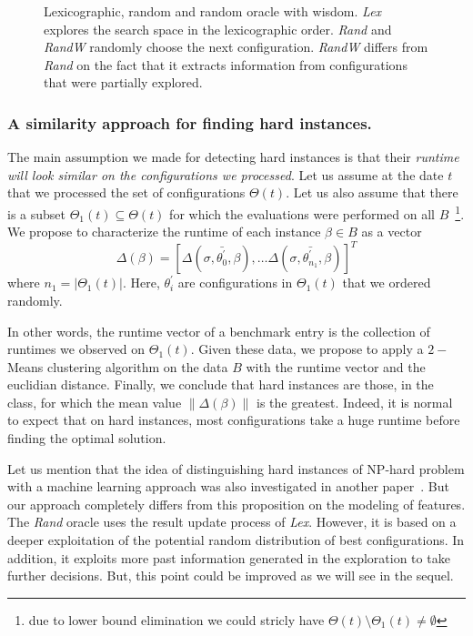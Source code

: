 \documentclass[10pt, conference, compsocconf]{IEEEtran}
\newcommand{\norm}[1]{\left\lVert#1\right\rVert}
\begin{document}
	\begin{figure}[hbtp]
	\begin{center}
	
	\caption{Lexicographic, random and random oracle with wisdom.
        {\it Lex} explores the search space in the lexicographic order. {\it Rand}  and {\it RandW} 
        randomly choose the next configuration. {\it RandW} differs from {\it Rand} on the fact that 
        it extracts information from configurations that were partially explored.}
	\label{fig:Search}
	\end{center}
	\end{figure}


\subsubsection{A similarity approach for finding hard instances.}  

The main assumption we made for detecting hard instances is that their {\it runtime will look similar on the configurations 
we processed}.
Let us assume at the date $t$ that we processed the set of configurations $\Theta(t)$. Let us also assume that 
there is a subset $\Theta_1(t) \subseteq \Theta(t)$ for which the evaluations were performed on all $B$~\footnote{due 
to lower bound elimination we could stricly have $\Theta(t) \setminus \Theta_1(t) \neq \emptyset$}. 
We propose to characterize the runtime of each instance $\beta \in B$ as a vector \[ \Delta(\beta) = [\Delta(\sigma, \bar{\theta^{'}_0}, \beta), \dots \Delta(\sigma, \bar{\theta^{'}_{n_1}}, \beta) ]^T \] where $n_1 = |\Theta_1(t)|$. Here, $\theta^{'}_{i}$ are configurations in $\Theta_1(t)$ 
that we ordered randomly.

In other words, the runtime vector of a benchmark entry is the collection of runtimes we observed on $\Theta_1(t)$. 
Given these data, we propose to apply a $2-$Means clustering algorithm on the data $B$ with the runtime 
vector and the euclidian distance. Finally, we conclude that hard instances are those, in the class, for 
which the mean value $\norm{\Delta(\beta)}$ is the greatest. Indeed, it is normal to expect that on hard instances, 
most configurations take a huge runtime before finding the optimal solution. 

Let us mention that the idea of distinguishing hard instances of NP-hard problem with a machine learning approach was also 
investigated in another paper~\cite{WZZReport}. But our approach completely differs from this proposition on the modeling 
of features. 
The {\it Rand} oracle uses the result update process of {\it Lex}. However, it is based on a deeper exploitation 
of the potential random distribution of best configurations. In addition, it exploits more past information generated in 
the exploration to take further decisions. But, this point could be improved as we will see in the sequel.
\end{document}
